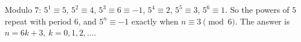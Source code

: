 Modulo $7$: $5^1\equiv5$, $5^2\equiv4$, $5^3\equiv6\equiv-1$, $5^4\equiv2$, $5^5\equiv3$, $5^6\equiv1$. So the powers of $5$ repeat with period $6$, and $5^n\equiv-1$ exactly when $n\equiv3\pmod6$. The answer is $\boxed{n=6k+3,\ k=0,1,2,\dots}$.

